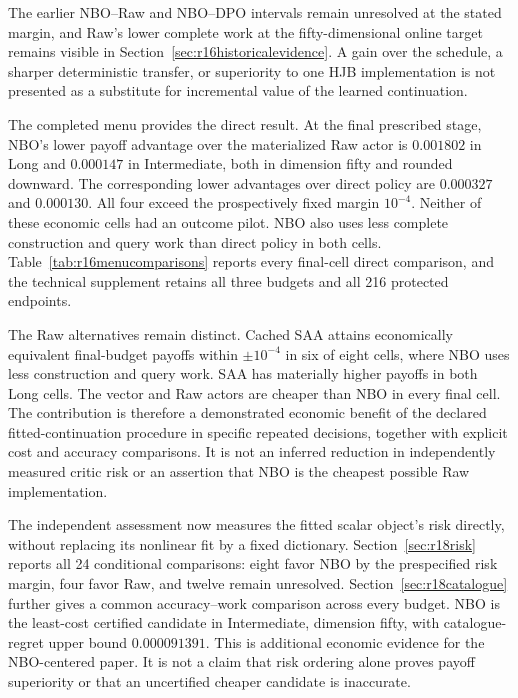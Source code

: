 The earlier NBO--Raw and NBO--DPO intervals remain unresolved at the stated margin, and Raw's lower complete work at the fifty-dimensional online target remains visible in Section~\ref{sec:r16historicalevidence}. A gain over the schedule, a sharper deterministic transfer, or superiority to one HJB implementation is not presented as a substitute for incremental value of the learned continuation.

The completed menu provides the direct result. At the final prescribed stage, NBO's lower payoff advantage over the materialized Raw actor is $0.001802$ in Long and $0.000147$ in Intermediate, both in dimension fifty and rounded downward. The corresponding lower advantages over direct policy are $0.000327$ and $0.000130$. All four exceed the prospectively fixed margin $10^{-4}$. Neither of these economic cells had an outcome pilot. NBO also uses less complete construction and query work than direct policy in both cells. Table~\ref{tab:r16menucomparisons} reports every final-cell direct comparison, and the technical supplement retains all three budgets and all 216 protected endpoints.

The Raw alternatives remain distinct. Cached SAA attains economically equivalent final-budget payoffs within $\pm10^{-4}$ in six of eight cells, where NBO uses less construction and query work. SAA has materially higher payoffs in both Long cells. The vector and Raw actors are cheaper than NBO in every final cell. The contribution is therefore a demonstrated economic benefit of the declared fitted-continuation procedure in specific repeated decisions, together with explicit cost and accuracy comparisons. It is not an inferred reduction in independently measured critic risk or an assertion that NBO is the cheapest possible Raw implementation.


The independent assessment now measures the fitted scalar object's risk directly, without replacing its nonlinear fit by a fixed dictionary. Section~\ref{sec:r18risk} reports all 24 conditional comparisons: eight favor NBO by the prespecified risk margin, four favor Raw, and twelve remain unresolved. Section~\ref{sec:r18catalogue} further gives a common accuracy--work comparison across every budget. NBO is the least-cost certified candidate in Intermediate, dimension fifty, with catalogue-regret upper bound $0.000091391$. This is additional economic evidence for the NBO-centered paper. It is not a claim that risk ordering alone proves payoff superiority or that an uncertified cheaper candidate is inaccurate.

